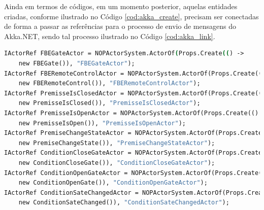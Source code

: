 Ainda em termos de códigos, em um momento posterior, aquelas entidades criadas,
conforme ilustrado no Código \ref{cod:akka_create}, precisam ser conectadas de
forma a passar as referências para o processo de envio de mensagens do Akka.NET,
sendo tal processo ilustrado no Código \ref{cod:akka_link}.

\begin{lstlisting}[language = csh, caption = {Criação de atores em Akka.NET}, %float=htb,
source = {Adaptado de \citeonline{martini_2019}}, label = {cod:akka_create}, language={csh}]
IActorRef FBEGateActor = NOPActorSystem.ActorOf(Props.Create(() ->
    new FBEGate()), "FBEGateActor");
IActorRef FBERemoteControlActor = NOPActorSystem.ActorOf(Props.Create(() ->
    new FBERemoteControl()), "FBERemoteControlActor");
IActorRef PremisseIsClosedActor = NOPActorSystem.ActorOf(Props.Create(() ->
    new PremisseIsClosed()), "PremisseIsClosedActor");
IActorRef PremisseIsOpenActor = NOPActorSystem.ActorOf(Props.Create(() ->
    new PremisseIsOpen()), "PremisseIsOpenActor");
IActorRef PremiseChangeStateActor = NOPActorSystem.ActorOf(Props.Create(() ->
    new PremiseChangeState()), "PremiseChangeStateActor");
IActorRef ConditionCloseGateActor = NOPActorSystem.ActorOf(Props.Create(() ->
    new ConditionCloseGate()), "ConditionCloseGateActor");
IActorRef ConditionOpenGateActor = NOPActorSystem.ActorOf(Props.Create(() ->
    new ConditionOpenGate()), "ConditionOpenGateActor");
IActorRef ConditionSateChangedActor = NOPActorSystem.ActorOf(Props.Create(() ->
    new ConditionSateChanged()), "ConditionSateChangedActor");
\end{lstlisting}

